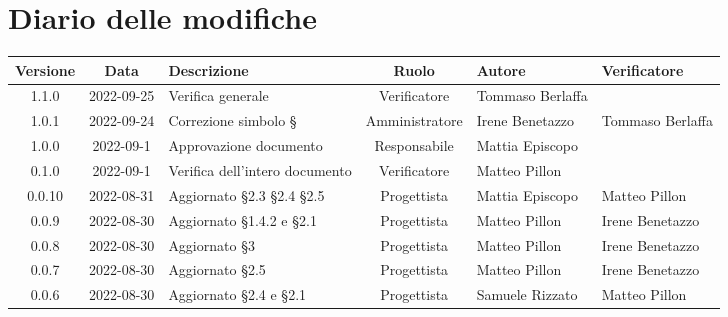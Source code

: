 \section*{Diario delle modifiche}
	\begin{center}
	\renewcommand{\arraystretch}{1.8} %
	\begin{longtable}{ |c|c|p{8em}|c|m{5em}|m{6em}| }
	\hline
	\textbf{Versione} & \textbf{Data} & \textbf{Descrizione} &  \textbf{Ruolo} &  \textbf{Autore} & \textbf{Verificatore}\\ %
	\hline %
	1.1.0 & 2022-09-25 & Verifica generale & Verificatore & Tommaso \newline Berlaffa &\\ 
	\hline
  1.0.1 & 2022-09-24 & Correzione simbolo § & Amministratore & Irene \newline Benetazzo & Tommaso \newline Berlaffa \\ 
	\hline
	1.0.0 & 2022-09-1 & Approvazione documento & Responsabile & Mattia \newline Episcopo & \\ 
	\hline
	0.1.0 & 2022-09-1 & Verifica dell'intero documento & Verificatore & Matteo \newline Pillon & \\ 
	\hline
	0.0.10 & 2022-08-31 & Aggiornato §2.3 §2.4 §2.5 & Progettista & Mattia \newline Episcopo & Matteo \newline Pillon\\ 
	\hline
	0.0.9 & 2022-08-30 & Aggiornato §1.4.2 e §2.1 & Progettista & Matteo \newline Pillon & Irene \newline Benetazzo\\ 
	\hline
	0.0.8 & 2022-08-30 & Aggiornato §3 & Progettista & Matteo \newline Pillon & Irene \newline Benetazzo\\ 
	\hline
	0.0.7 & 2022-08-30 & Aggiornato §2.5 & Progettista & Matteo \newline Pillon & Irene \newline Benetazzo\\ 
	\hline
	0.0.6 & 2022-08-30 & Aggiornato §2.4 e §2.1 & Progettista & Samuele \newline Rizzato & Matteo Pillon \\ 

\end{longtable}
\end{center}
